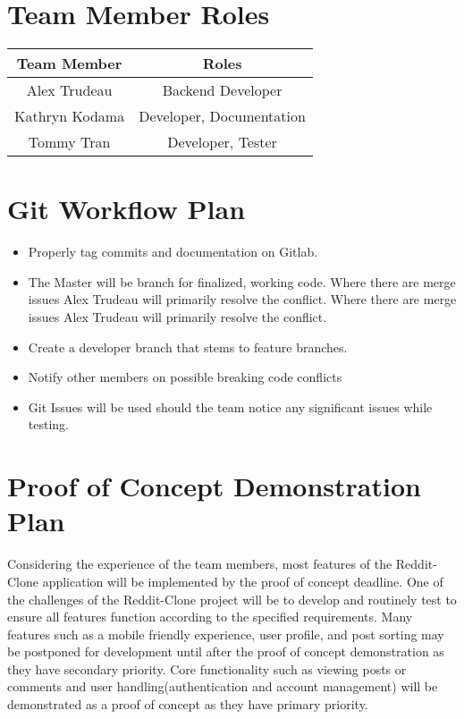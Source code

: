 \documentclass[12pt,fleqn]{article}
\begin{document}
\section {Team Member Roles}
\begin{tabular}{ | c | c | }
\hline 
\textbf{Team Member} & \textbf{Roles} \\
\hline
Alex Trudeau & Backend Developer \\
\hline 
Kathryn Kodama & Developer, Documentation \\
\hline
Tommy Tran & Developer, Tester \\
\hline

\end{tabular}

\section {Git Workflow Plan}
\begin{itemize}
\item Properly tag commits and documentation on Gitlab.
\item The Master will be branch for finalized, working code.  Where there are merge issues Alex Trudeau will primarily resolve the conflict.  Where there are merge issues Alex Trudeau will primarily resolve the conflict.
\item Create a developer branch that stems to feature branches.
\item Notify other members on possible breaking code conflicts
\item Git Issues will be used should the team notice any significant issues while testing. 
\end{itemize}

\section {Proof of Concept Demonstration Plan}
Considering the experience of the team members, most features of the Reddit-Clone application will be implemented by the proof of concept deadline.  One of the challenges of the Reddit-Clone project will be to develop and routinely test to ensure all features function according to the specified requirements. Many features such as a mobile friendly experience, user profile, and post sorting may be postponed for development until after the proof of concept demonstration as they have secondary priority. Core functionality such as viewing posts or comments and user handling(authentication and account management) will be demonstrated as a proof of concept as they have primary priority.
\end{document}

